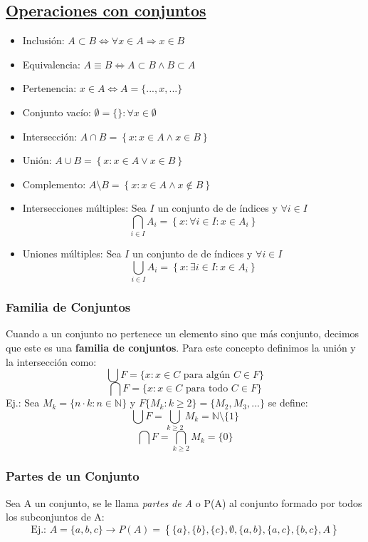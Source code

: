 \documentclass[10pt,a4paper,openright]{book}
\begin{document}
\subsection*{\underline{Operaciones con conjuntos}}
\begin{itemize}
\item Inclusión: $A\subset B \Leftrightarrow \forall x \in A \Rightarrow x \in B$
\item Equivalencia: $A \equiv B \Leftrightarrow A \subset B \wedge B \subset A$
\item Pertenencia: $x \in A \Leftrightarrow A=\{...,x,...\}$
\item Conjunto vacío: $\emptyset=\{\}: \forall x \in \emptyset$
\item Intersección: $A \cap B=\left\lbrace x: x\in A \wedge x\in B \right\rbrace$
\item Unión: $A \cup B=\left\lbrace x: x\in A \vee x\in B \right\rbrace$
\item Complemento: $A \mbox{\textbackslash} B=\left\lbrace x: x\in A \wedge x\notin B \right\rbrace$
\item Intersecciones múltiples: Sea $I$ un conjunto de de índices y $\forall i \in I$
$$\bigcap_{i\in I}A_i=\left\lbrace x: \forall i \in I : x\in A_i\right\rbrace$$
\item Uniones múltiples: Sea $I$ un conjunto de de índices y $\forall i \in I$
$$\bigcup_{i\in I}A_i=\left\lbrace x: \exists i \in I: x\in A_i\right\rbrace$$
\end{itemize}

\subsubsection*{Familia de Conjuntos}
Cuando a un conjunto no pertenece un elemento sino que más conjunto, decimos que este es una \textbf{familia de conjuntos}. Para este concepto definimos la unión y la intersección como:
$$\bigcup F=\{x: x\in C\mbox{ para algún }C\in F\}$$
$$\bigcap F=\{x: x\in C\mbox{ para todo }C\in F\}$$
Ej.: Sea $M_k=\{n\cdot k: n\in \mathbb N\}$ y $F\{M_k: k\geq2\}=\{M_2,M_3, ...\}$ se define:
$$\bigcup F=\bigcup_{k\geq 2}M_k=\mathbb N\mbox{\textbackslash}\{1\}$$
$$\bigcap F=\bigcap_{k\geq 2}M_k=\{0\}$$

\subsubsection*{Partes de un Conjunto}
Sea A un conjunto, se le llama \textit{partes de A} o P(A) al conjunto formado por todos los subconjuntos de A:
$$\mbox{Ej.: } A=\{a,b,c\}\rightarrow P(A)=\left\lbrace \{a\}, \{b\},\{c\}, \emptyset, \{a,b\}, \{a,c\}, \{b,c\}, A \right\rbrace$$
\end{document}
